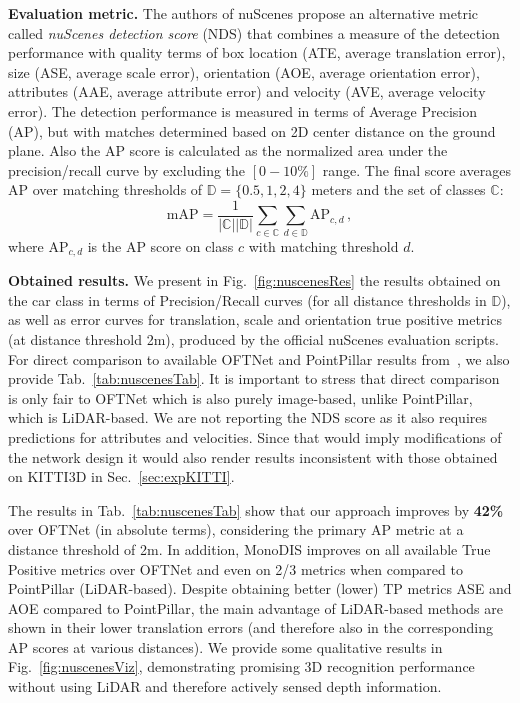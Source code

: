 \documentclass[10pt,twocolumn,letterpaper]{article}
\newcommand{\monodis}{MonoDIS}
\renewcommand{\paragraph}[1]{

        \vspace{3pt}
	\noindent\textbf{#1}}
\begin{document}
\paragraph{Evaluation metric.}
The authors of nuScenes propose an alternative metric called \emph{nuScenes detection score} (NDS) that combines a measure of the detection performance with quality terms of box location (ATE, average translation error), size (ASE, average scale error), orientation (AOE, average orientation error), attributes (AAE, average attribute error) and velocity (AVE, average velocity error). The detection performance is measured in terms of Average Precision (AP), but with matches determined based on 2D center distance on the ground plane. Also the AP score is calculated as the normalized area under the precision/recall curve by excluding the $[0-10\%]$ range. The final score averages AP over matching thresholds of $\mathbb D=\{0.5,1,2,4\}$ meters and the set of classes $\mathbb C$:
\[
	\text{mAP}=\frac{1}{|\mathbb C| |\mathbb D|}\sum_{c\in\mathbb C}\sum_{d\in\mathbb D} \text{AP}_{c,d}\,,
\]
where $\text{AP}_{c,d}$ is the AP score on class $c$ with matching threshold $d$. 

\paragraph{Obtained results.}
We present in Fig.~\ref{fig:nuscenesRes} the results obtained on the car class in terms of Precision/Recall curves (for all distance thresholds in $\mathbb D$), as well as error curves for translation, scale and orientation true positive metrics (at distance threshold 2m), produced by the official nuScenes evaluation scripts. For direct comparison to available OFTNet and PointPillar results from~\cite{Cae+19}, we also provide Tab.~\ref{tab:nuscenesTab}. It is important to stress that direct comparison is only fair to OFTNet which is also purely image-based, unlike PointPillar, which is LiDAR-based. We are not reporting the NDS score as it also requires predictions for attributes and velocities. Since that would imply modifications of the network design it would also render results inconsistent with those obtained on KITTI3D in Sec.~\ref{sec:expKITTI}. 

The results in Tab.~\ref{tab:nuscenesTab} show that our approach improves by \textbf{42\%} over OFTNet (in absolute terms), considering the primary AP metric at a distance threshold of 2m. In addition, \monodis{} improves on all available True Positive metrics over OFTNet and even on 2/3 metrics when compared to PointPillar (LiDAR-based). Despite obtaining better (lower) TP metrics ASE and AOE compared to PointPillar, the main advantage of LiDAR-based methods are shown in their lower translation errors (and therefore also in the corresponding AP scores at various distances). We provide some qualitative results in Fig.~\ref{fig:nuscenesViz}, demonstrating promising 3D recognition performance without using LiDAR and therefore actively sensed depth information.
\end{document}
